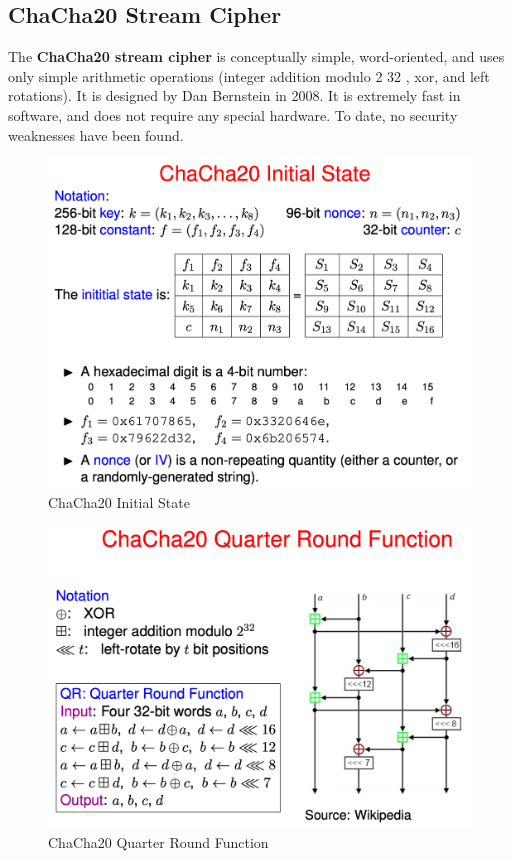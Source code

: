 \documentclass[12pt,titlepage]{article}
\begin{document}
\subsection{ChaCha20 Stream Cipher}
The \textbf{ChaCha20 stream cipher} is conceptually simple, word-oriented, and uses only simple arithmetic operations (integer addition modulo 2 32 , xor, and left rotations). It is designed by Dan Bernstein in 2008. It is extremely fast in software, and does not require any special hardware. To date, no security weaknesses have been found.
\begin{center}
	\begin{figure}[h!]
		\includegraphics[width=\textwidth]{ChaCha20_Initial.png}
		\caption{ChaCha20 Initial State}
	\end{figure}
\end{center}
\newpage
\begin{center}
	\begin{figure}[h!]
		\includegraphics[width=\textwidth]{ChaCha20_quarter_round.png}
		\caption{ChaCha20 Quarter Round Function}
	\end{figure}
\end{center}
\end{document}
